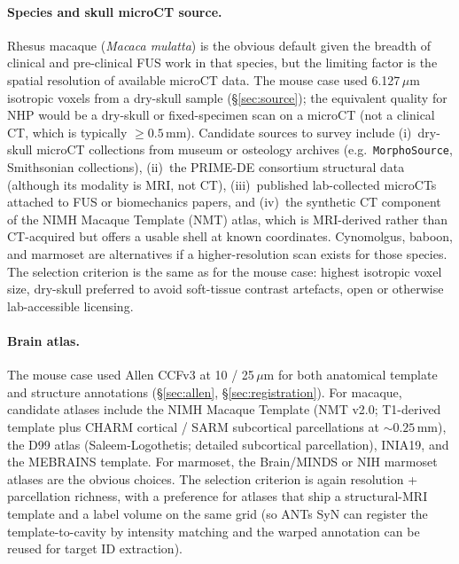 \documentclass{compactarticle}
\begin{document}
\paragraph{Species and skull microCT source.} Rhesus macaque
(\emph{Macaca mulatta}) is the obvious default given the breadth of
clinical and pre-clinical FUS work in that species, but the limiting
factor is the spatial resolution of available microCT data. The
mouse case used 6.127\,$\mu$m isotropic voxels from a dry-skull
sample (\S\ref{sec:source}); the equivalent quality for NHP
would be a dry-skull or fixed-specimen scan on a microCT (not a
clinical CT, which is typically $\ge 0.5$\,mm). Candidate sources to
survey include (i)~dry-skull microCT collections from museum or
osteology archives (e.g.\ \texttt{MorphoSource}, Smithsonian
collections), (ii)~the PRIME-DE consortium structural data (although
its modality is MRI, not CT), (iii)~published lab-collected microCTs
attached to FUS or biomechanics papers, and (iv)~the synthetic CT
component of the NIMH Macaque Template (NMT) atlas, which is
MRI-derived rather than CT-acquired but offers a usable shell at
known coordinates. Cynomolgus, baboon, and marmoset are alternatives
if a higher-resolution scan exists for those species. The selection
criterion is the same as for the mouse case: highest isotropic
voxel size, dry-skull preferred to avoid soft-tissue contrast
artefacts, open or otherwise lab-accessible licensing.

\paragraph{Brain atlas.} The mouse case used Allen CCFv3 at
10 / 25\,$\mu$m for both anatomical template and structure
annotations (\S\ref{sec:allen}, \S\ref{sec:registration}). For
macaque, candidate atlases include the NIMH Macaque Template (NMT
v2.0; T1-derived template plus CHARM cortical / SARM subcortical
parcellations at $\sim 0.25$\,mm), the D99 atlas (Saleem-Logothetis;
detailed subcortical parcellation), INIA19, and the MEBRAINS
template. For marmoset, the Brain/MINDS or NIH marmoset atlases
are the obvious choices. The selection criterion is again
resolution + parcellation richness, with a preference for atlases
that ship a structural-MRI template and a label volume on the same
grid (so ANTs SyN can register the template-to-cavity by intensity
matching and the warped annotation can be reused for target ID
extraction).
\end{document}
